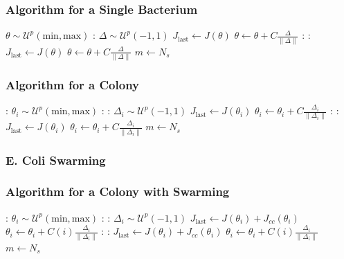 \documentclass{beamer}
\begin{document}
\begin{frame}
\frametitle{Algorithm for a Single Bacterium}
\begin{algorithmic}[1]
\State $\theta \sim \mathcal{U}^p(\text{min}, \text{max})$
:
  \State $\Delta \sim \mathcal{U}^p(-1, 1)$
  \State $J_\text{last} \gets J(\theta)$
  \State $\theta \gets \theta + C \frac{\Delta}{\| \Delta \|}$
  :
    :
      \State $J_\text{last} \gets J(\theta)$
      \State $\theta \gets \theta + C \frac{\Delta}{\| \Delta \|}$
    \Else
      \State $m \gets N_s$
    \EndIf
  \EndFor
\EndFor
\end{algorithmic}
\end{frame}

\begin{frame}
\frametitle{Algorithm for a Colony}
\begin{algorithmic}[1]
:
  \State $\theta_i \sim \mathcal{U}^p(\text{min}, \text{max})$
\EndFor
{}:
  :
    \State $\Delta_i \sim \mathcal{U}^p(-1, 1)$
    \State $J_\text{last} \gets J(\theta_i)$
    \State $\theta_i \gets \theta_i + C \frac{\Delta_i}{\| \Delta_i \|}$
    :
      :
        \State $J_\text{last} \gets J(\theta_i)$
        \State $\theta_i \gets \theta_i + C \frac{\Delta_i}{\| \Delta_i \|}$
      \Else
        \State $m \gets N_s$
      \EndIf
    \EndFor
  \EndFor
\EndFor
\end{algorithmic}
\end{frame}

\begin{frame}
\frametitle{E. Coli Swarming}

\end{frame}

\begin{frame}
\frametitle{Algorithm for a Colony with Swarming}
\begin{algorithmic}[1]
:
  \State $\theta_i \sim \mathcal{U}^p(\text{min}, \text{max})$
\EndFor
{}:
  :
    \State $\Delta_i \sim \mathcal{U}^p(-1, 1)$
    \State $J_\text{last} \gets J(\theta_i) + J_{cc}(\theta_i)$
    \State $\theta_i \gets \theta_i + C(i) \frac{\Delta_i}{\| \Delta_i \|}$
    :
      :
        \State $J_\text{last} \gets J(\theta_i) + J_{cc}(\theta_i)$
        \State $\theta_i \gets \theta_i + C(i) \frac{\Delta_i}{\| \Delta_i \|}$
      \Else
        \State $m \gets N_s$
      \EndIf
    \EndFor
  \EndFor
\EndFor
\end{algorithmic}
\end{frame}
\end{document}
